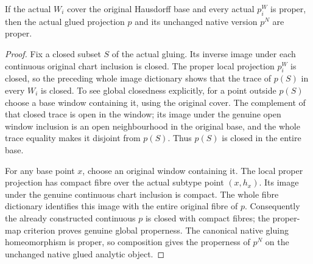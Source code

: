 \begin{theorem}
\label{hir:disjoint-proper-global-glued-projection}
\leanok
If the actual $W_i$ cover the original Hausdorff base and every actual $p_i^W$
is proper, then the actual glued projection $p$ and its unchanged native
version $p^N$ are proper.
\end{theorem}
\begin{proof}
Fix a closed subset $S$ of the actual gluing. Its inverse image under each
continuous original chart inclusion is closed. The proper local projection
$p_i^W$ is closed, so the preceding whole image dictionary shows that the
trace of $p(S)$ in every $W_i$ is closed. To see global closedness explicitly,
for a point outside $p(S)$ choose a base window containing it, using the
original cover. The complement of that closed trace is open in the window;
its image under the genuine open window inclusion is an open neighbourhood
in the original base, and the whole trace equality makes it disjoint from
$p(S)$. Thus $p(S)$ is closed in the entire base.

For any base point $x$, choose an original window containing it. The local
proper projection has compact fibre over the actual subtype point $(x,h_x)$.
Its image under the genuine continuous chart inclusion is compact. The whole
fibre dictionary identifies this image with the entire original fibre of $p$.
Consequently the already constructed continuous $p$ is closed with compact
fibres; the proper-map criterion proves genuine global properness. The
canonical native gluing homeomorphism is proper, so composition gives the
properness of $p^N$ on the unchanged native glued analytic object.
\end{proof}


